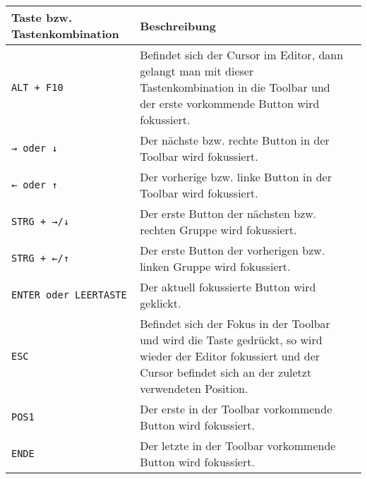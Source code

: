 \begin{table}[H]
\begin{tabular}{lp{9cm}l}
\hline
Taste bzw. Tastenkombination & Beschreibung                                                                                                                                                               \\ \hline
\texttt{ALT + F10} & Befindet sich der Cursor im Editor, dann gelangt man mit dieser Tastenkombination in die Toolbar und der erste vorkommende Button wird fokussiert.                         \\ \hline
\texttt{→ oder ↓} & Der nächste bzw. rechte Button in der Toolbar wird fokussiert.                                                                                                             \\ \hline
\texttt{← oder ↑} & Der vorherige bzw. linke Button in der Toolbar wird fokussiert.                                                                                                            \\ \hline
\texttt{STRG + →/↓} & Der erste Button der nächsten bzw. rechten Gruppe wird fokussiert.                                                                                                         \\ \hline
\texttt{STRG + ←/↑} & Der erste Button der vorherigen bzw. linken Gruppe wird fokussiert.                                                                                                        \\ \hline
\texttt{ENTER oder LEERTASTE} & Der aktuell fokussierte Button wird geklickt.                                                                                                                              \\ \hline
\texttt{ESC} & Befindet sich der Fokus in der Toolbar und wird die Taste gedrückt, so wird wieder der Editor fokussiert und der Cursor befindet sich an der zuletzt verwendeten Position. 
\\ \hline
\texttt{POS1} & Der erste in der Toolbar vorkommende Button wird fokussiert.                                                                                                               \\ \hline
\texttt{ENDE} & Der letzte in der Toolbar vorkommende Button wird fokussiert.                                                                                                              \\ \hline
\end{tabular}
\end{table}

